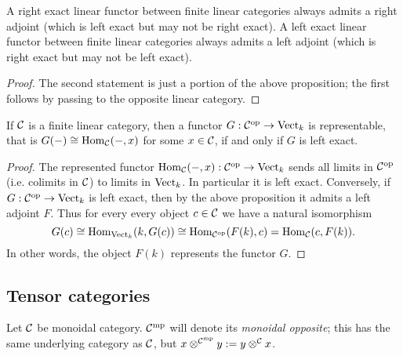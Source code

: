 \documentclass{amsart}
\begin{document}
\begin{corollary}
	A right exact linear functor between finite linear categories always admits a right adjoint (which is left exact but may not be right exact). A left exact linear functor between finite linear categories always admits a left adjoint (which is right exact but may not be left exact). 
\end{corollary}

\begin{proof}
	The second statement is just a portion of the above proposition; the first follows by passing to the opposite linear category.  
\end{proof}

\begin{corollary} \label{cor:representable}
If $\mathcal C$ is a finite linear category, then a functor $G: \mathcal C^\textrm{op} \to \mathrm{Vect}_k$ is representable, that is $G(-) \cong \operatorname{Hom}_{\mathcal C}(-,x)$ for some $x \in \mathcal C$, if and only if $G$ is left exact. 
\end{corollary}

\begin{proof}
	The represented functor $\operatorname{Hom}_{\mathcal C}(-, x):\mathcal C^\text{op} \to \mathrm{Vect}_k$ sends all limits in $\mathcal C^\text{op}$ (i.e. colimits in $\mathcal C$) to limits in $\mathrm{Vect}_k$. In particular it is left exact. 
%
%		
Conversely, if $G: \mathcal C^\text{op} \to \mathrm{Vect}_k$ is left exact, then by the above proposition it admits a left adjoint $F$. Thus for every every object $c \in \mathcal C$ we have a natural isomorphism
	\begin{equation*}
		G(c) \cong \operatorname{Hom}_{\mathrm{Vect}_k}( k, G(c)) \cong \operatorname{Hom}_{\mathcal C^{\mathrm{op}}}( F(k), c) = \operatorname{Hom}_{\mathcal C}(c, F(k) ).
	\end{equation*}
	In other words,  the object $F(k)$ represents the functor $G$. 
\end{proof}

\subsection{Tensor categories}  


Let $\mathcal C$ be monoidal category. $\mathcal C^{\mathrm{mp}}$ will denote its {\em monoidal opposite}; this has the same underlying category as $\mathcal C$, but $x \otimes^{\mathcal C^{\mathrm{mp}}} y : = y \otimes^{\mathcal C} x$. 
\end{document}
